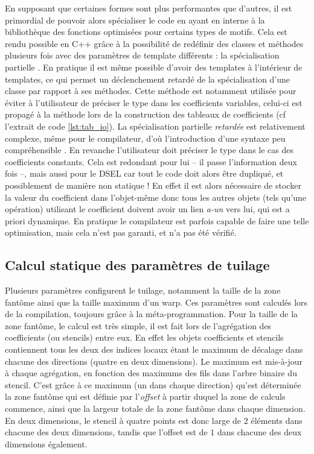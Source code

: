 En supposant que certaines formes sont plus performantes que d'autres, il est primordial de pouvoir alors spécialiser le code en ayant en interne à la bibliothèque des fonctions optimisées pour certains types de motifs. Cela est rendu possible en \textsf{C++} grâce à la possibilité de redéfinir des classes et méthodes plusieurs fois avec des paramètres de template différents : la spécialisation partielle \cite{Web1}. En pratique il est même possible d'avoir des templates à l'intérieur de templates, ce qui permet un déclenchement retardé de la spécialisation d'une classe par rapport à ses méthodes. Cette méthode est notamment utilisée pour éviter à l'utilisateur de préciser le type dans les coefficients variables, celui-ci est propagé à la méthode lors de la construction des tableaux de coefficients (cf l'extrait de code \ref{lst:tab_io}). La spécialisation partielle \emph{retardée} est relativement complexe, même pour le compilateur, d'où l'introduction d'une syntaxe peu compréhensible \cite{Web2}. En revanche l'utilisateur doit préciser le type dans le cas des coefficients constants. Cela est redondant pour lui -- il passe l'information deux fois --, mais aussi pour le DSEL car tout le code doit alors être dupliqué, et possiblement de manière non statique ! En effet il est alors nécessaire de stocker la valeur du coefficient dans l'objet-même donc tous les autres objets (tels qu'une opération) utilisant le coefficient doivent avoir un lien \emph{a-un} vers lui, qui est a priori dynamique. En pratique le compilateur est parfois capable de faire une telle optimisation, mais cela n'est pas garanti, et n'a pas été vérifié.


\subsection{Calcul statique des paramètres de tuilage}
\label{sec:param_tuile}

Plusieurs paramètres configurent le tuilage, notamment la taille de la zone fantôme ainsi que la taille maximum d'un warp. Ces paramètres sont calculés lors de la compilation, toujours grâce à la méta-programmation. Pour la taille de la zone fantôme, le calcul est très simple, il est fait lors de l'agrégation des coefficients (ou stencils) entre eux. En effet les objets coefficients et stencils contiennent tous les deux des indices locaux étant le maximum de décalage dans chacune des directions (quatre en deux dimensions). Le maximum est mis-à-jour à chaque agrégation, en fonction des maximums des fils dans l'arbre binaire du stencil. C'est grâce à ce maximum (un dans chaque direction) qu'est déterminée la zone fantôme qui est définie par l'\emph{offset} à partir duquel la zone de calculs commence, ainsi que la largeur totale de la zone fantôme dans chaque dimension. En deux dimensions, le stencil à quatre points est donc large de $2$ éléments dans chacune des deux dimensions, tandis que l'offset est de $1$ dans chacune des deux dimensions également.

